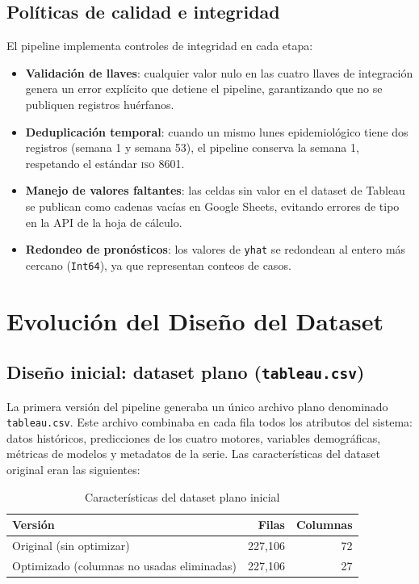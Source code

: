 \documentclass[12pt, letterpaper]{article}
\begin{document}
\subsection{Políticas de calidad e integridad}

El pipeline implementa controles de integridad en cada etapa:

\begin{itemize}[noitemsep]
    \item \textbf{Validación de llaves}: cualquier valor nulo en las cuatro llaves de integración genera un error explícito que detiene el pipeline, garantizando que no se publiquen registros huérfanos.
    \item \textbf{Deduplicación temporal}: cuando un mismo lunes epidemiológico tiene dos registros (semana 1 y semana 53), el pipeline conserva la semana 1, respetando el estándar \textsc{iso} 8601.
    \item \textbf{Manejo de valores faltantes}: las celdas sin valor en el dataset de Tableau se publican como cadenas vacías en Google Sheets, evitando errores de tipo en la API de la hoja de cálculo.
    \item \textbf{Redondeo de pronósticos}: los valores de \texttt{yhat} se redondean al entero más cercano (\texttt{Int64}), ya que representan conteos de casos.
\end{itemize}

\newpage
\section{Evolución del Diseño del Dataset}\label{sec:evolucion}

\subsection{Diseño inicial: dataset plano (\texttt{tableau.csv})}

La primera versión del pipeline generaba un único archivo plano denominado \texttt{tableau.csv}. Este archivo combinaba en cada fila todos los atributos del sistema: datos históricos, predicciones de los cuatro motores, variables demográficas, métricas de modelos y metadatos de la serie. Las características del dataset original eran las siguientes:

\begin{table}[H]
\centering
\caption{Características del dataset plano inicial}
\label{tab:dataset_original}
\small
\begin{tabular}{lrr}
\toprule
\textbf{Versión} & \textbf{Filas} & \textbf{Columnas} \\
\midrule
Original (sin optimizar) & 227,106 & 72 \\
Optimizado (columnas no usadas eliminadas) & 227,106 & 27 \\
\bottomrule
\end{tabular}
\end{table}
\end{document}

